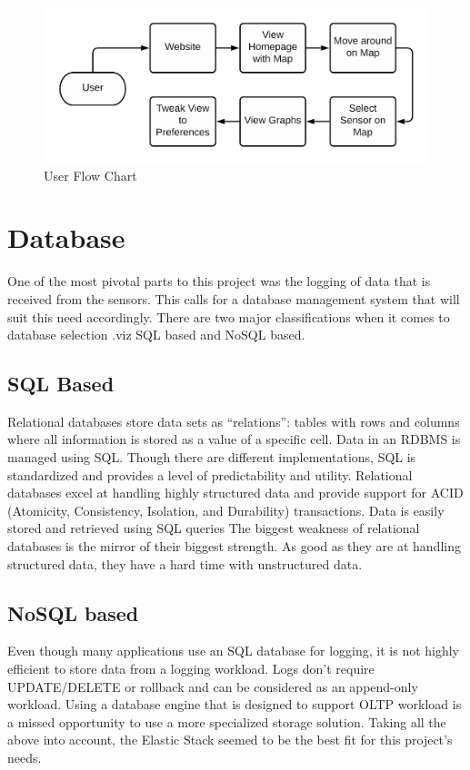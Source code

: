 \documentclass[]{report}
\begin{document}
\begin{figure}[ht]
  \includegraphics[width =\columnwidth]{userflow.png}
  \caption{User Flow Chart}
  \label{userflow}
\end{figure}

\section{Database}
One of the most pivotal parts to this project was the logging of data that is received from the sensors. This calls for a database management system that will suit this need accordingly. There are two major classifications when it comes to database selection .viz SQL based and NoSQL based.

\subsection{SQL Based}
Relational databases store data sets as “relations”: tables with rows and columns where all information is stored as a value of a specific cell. Data in an RDBMS is managed using SQL. Though there are different implementations, SQL is standardized and provides a level of predictability and utility.
Relational databases excel at handling highly structured data and provide support for ACID (Atomicity, Consistency, Isolation, and Durability) transactions. Data is easily stored and retrieved using SQL queries
The biggest weakness of relational databases is the mirror of their biggest strength. As good as they are at handling structured data, they have a hard time with unstructured data.

\subsection{NoSQL based}
Even though many applications use an SQL database for logging, it is not highly efficient to store data from a logging workload. Logs don’t require UPDATE/DELETE or rollback and can be considered as an append-only workload. Using a database engine that is designed to support OLTP workload is a missed opportunity to use a more specialized storage solution. Taking all the above into account, the Elastic Stack seemed to be the best fit for this project's needs.
\end{document}
